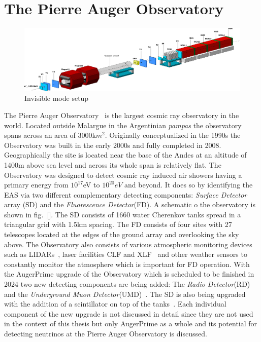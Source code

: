 
\chapter{The Pierre Auger Observatory}
\label{sec:setup}
\begin{figure}[h!]
\centering
\includegraphics[width=\textwidth]{thesis_figures/Invisible_3d_setup.png}
\caption{Invisible mode setup~\cite{Banerjee:2016tad}}
\label{fig:Invisible_mode_setup}
\end{figure}

The Pierre Auger Observatory~\cite{} is the largest cosmic ray observatory in the world. Located outside Malargue in the Argentinian \textit{pampas} the observatory spans across an area of 3000k$m^2$. Originally conceptualized in the 1990s the Observatory was built in the early 2000s and fully completed in 2008. Geographically the site is located near the base of the Andes at an altitude of 1400m above sea level and across its whole span is relatively flat. The Observatory was designed to detect cosmic ray induced air showers having a primary energy from $10^{17}$eV to $10^{20}eV$ and beyond. It does so by identifying the EAS via two different complementary detecting components: \textit{Surface Detector} array (SD) and the \textit{Fluorescence Detector}(FD). A schematic o the observatory is shown in fig.~\ref{}. The SD consists of 1660 water Cherenkov tanks spread in a triangular grid with 1.5km spacing. The FD consists of four sites with 27 telescopes located at the edges of the ground array and overlooking the sky above. The Observatory also consists of various atmospheric monitoring devices such as LIDARs~\cite{}, laser facilities CLF and XLF~\cite{} and other weather sensors to constantly monitor the atmosphere which is important for FD operation. With the AugerPrime upgrade of the Observatory which is scheduled to be finished in 2024 two new detecting components are being added: The \textit{Radio Detector}(RD)~\cite{} and the \textit{Underground Muon Detector}(UMD)~\cite{}. The SD is also being upgraded with the addition of a scintillator on top of the tanks~\cite{}. Each individual component of the new upgrade is not discussed in detail since they are not used in the context of this thesis but only AugerPrime as a whole and its potential for detecting neutrinos at the Pierre Auger Observatory is discussed.

